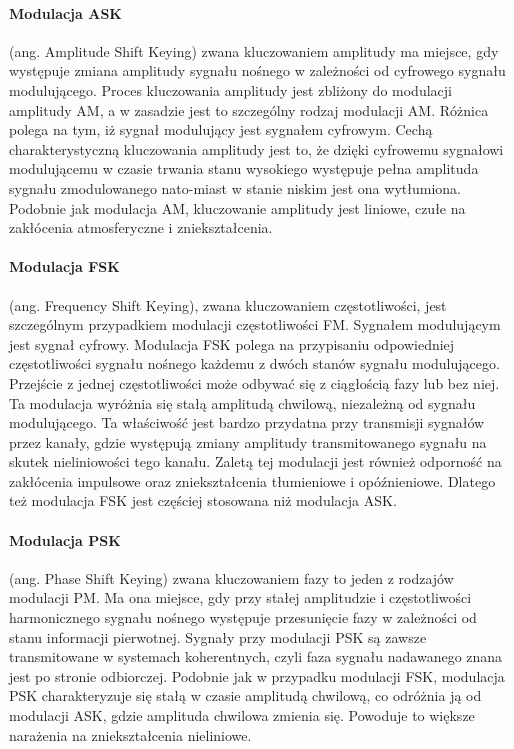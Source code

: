 \documentclass[a4paper,twoside]{report}
\begin{document}
\paragraph{Modulacja ASK} (ang. Amplitude Shift Keying) zwana kluczowaniem amplitudy ma miejsce, gdy występuje zmiana amplitudy sygnału nośnego w zależności od cyfrowego sygnału modulującego. Proces kluczowania amplitudy jest zbliżony do modulacji amplitudy AM, a w zasadzie jest to szczególny rodzaj modulacji AM. Różnica polega na tym, iż sygnał modulujący jest sygnałem cyfrowym. Cechą charakterystyczną kluczowania amplitudy jest to, że dzięki cyfrowemu sygnałowi modulującemu w czasie trwania stanu wysokiego występuje pełna amplituda sygnału zmodulowanego nato-miast w stanie niskim jest ona wytłumiona. Podobnie jak modulacja AM, kluczowanie amplitudy jest liniowe, czułe na zakłócenia atmosferyczne i zniekształcenia. 

\paragraph{Modulacja FSK}  (ang. Frequency Shift Keying), zwana kluczowaniem częstotliwości, jest szczególnym przypadkiem modulacji częstotliwości FM. Sygnałem modulującym jest sygnał cyfrowy. Modulacja FSK polega na przypisaniu odpowiedniej częstotliwości sygnału nośnego każdemu z dwóch stanów sygnału modulującego. Przejście z jednej częstotliwości może odbywać się z ciągłością fazy lub bez niej. Ta modulacja wyróżnia się stałą amplitudą chwilową, niezależną od sygnału modulującego. Ta właściwość jest bardzo przydatna przy transmisji sygnałów przez kanały, gdzie występują zmiany amplitudy transmitowanego sygnału na skutek nieliniowości tego kanału. Zaletą tej modulacji jest również odporność na zakłócenia impulsowe oraz zniekształcenia tłumieniowe i opóźnieniowe. Dlatego też modulacja FSK jest częściej stosowana niż modulacja ASK. 


\paragraph{Modulacja PSK} (ang. Phase Shift Keying) zwana kluczowaniem fazy to jeden z rodzajów modulacji PM. Ma ona miejsce, gdy przy stałej amplitudzie i częstotliwości harmonicznego sygnału nośnego występuje przesunięcie fazy w zależności od stanu informacji pierwotnej. Sygnały przy modulacji PSK są zawsze transmitowane w systemach koherentnych, czyli faza sygnału nadawanego znana jest po stronie odbiorczej. Podobnie jak w przypadku modulacji FSK, modulacja PSK charakteryzuje się stałą w czasie amplitudą chwilową, co odróżnia ją od modulacji ASK, gdzie amplituda chwilowa zmienia się. Powoduje to większe narażenia na zniekształcenia nieliniowe. 
\end{document}
